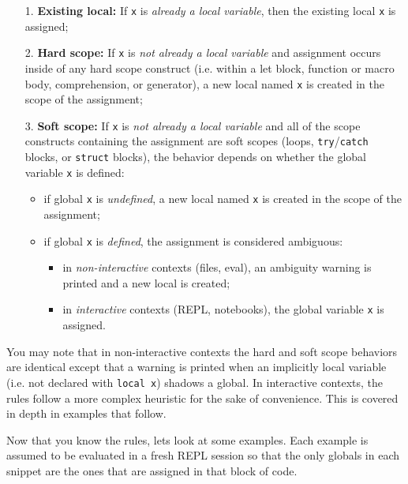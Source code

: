 \begin{itemize}
\item[1. ] \textbf{Existing local:} If \texttt{x} is \emph{already a local variable}, then the existing local \texttt{x} is assigned;


\item[2. ] \textbf{Hard scope:} If \texttt{x} is \emph{not already a local variable} and assignment occurs inside of any hard scope construct (i.e. within a let block, function or macro body, comprehension, or generator), a new local named \texttt{x} is created in the scope of the assignment;


\item[3. ] \textbf{Soft scope:} If \texttt{x} is \emph{not already a local variable} and all of the scope constructs containing the assignment are soft scopes (loops, \texttt{try}/\texttt{catch} blocks, or \texttt{struct} blocks), the behavior depends on whether the global variable \texttt{x} is defined:

\begin{itemize}
\item if global \texttt{x} is \emph{undefined}, a new local named \texttt{x} is created in the scope of the assignment;


\item if global \texttt{x} is \emph{defined}, the assignment is considered ambiguous:

\begin{itemize}
\item in \emph{non-interactive} contexts (files, eval), an ambiguity warning is printed and a new local is created;


\item in \emph{interactive} contexts (REPL, notebooks), the global variable \texttt{x} is assigned.

\end{itemize}
\end{itemize}
\end{itemize}


You may note that in non-interactive contexts the hard and soft scope behaviors are identical except that a warning is printed when an implicitly local variable (i.e. not declared with \texttt{local x}) shadows a global. In interactive contexts, the rules follow a more complex heuristic for the sake of convenience. This is covered in depth in examples that follow.



Now that you know the rules, let{\textquotesingle}s look at some examples. Each example is assumed to be evaluated in a fresh REPL session so that the only globals in each snippet are the ones that are assigned in that block of code.



